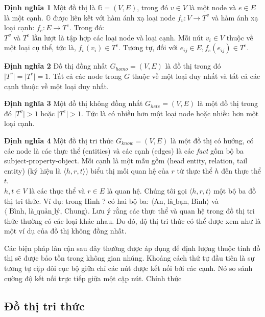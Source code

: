 \textbf{Định nghĩa 1} Một đồ thị là \(\mathbb{G} = (V, E)\), trong đó \(v \in V\) là một node và \(e \in E\) là một cạnh. \(\mathbb{G}\) được liên kết với hàm ánh xạ loại node \(f_v: V \to T^v\) và hàm ánh xạ loại cạnh: \(f_e: E \to T^e\). Trong đó: \\
\(T^v\) và \(T^e\) lần lượt là tập hợp các loại node và loại cạnh. Mỗi nút \(v_i \in V\) thuộc về một loại cụ thể, tức là, \(f_v(v_i) \in T^v\). Tương tự, đối với \(e_{ij} \in E, f_e (e_{ij}) \in T^e\).

\textbf{Định nghĩa 2} Đồ thị đồng nhất $G_{homo} = (V, E)$ là đồ thị trong đó $\mid T^v \mid = \mid T^e \mid = 1$. Tất cả các node trong $G$ thuộc về một loại duy nhất và tất cả các cạnh thuộc về một loại duy nhất.

\textbf{Định nghĩa 3} Một đồ thị không đồng nhất $G_{hete} = (V, E)$ là một đồ thị trong đó $\mid T^v \mid > 1$ hoặc $\mid T^e \mid > 1$. Tức là có nhiều hơn một loại node hoặc nhiều hơn một loại cạnh.

\textbf{Định nghĩa 4} Một đồ thị tri thức $G_{know} = (V, E)$ là một đồ thị có hướng, có các node là các thực thể (entities) và các cạnh (edges) là các \textit{fact} gồm bộ ba subject-property-object. Mỗi cạnh là một mẫu gồm (head entity, relation, tail entity) (ký hiệu là $\langle h, r, t \rangle$) biểu thị mối quan hệ của $r$ từ thực thể $h$ đến thực thể $t$.\\
$h, t \in V$ là các thực thể và $r \in E$ là quan hệ. Chúng tôi gọi $\langle h, r, t \rangle$ một bộ ba đồ thị tri thức. Ví dụ: trong Hình ? có hai bộ ba: $\langle \text{An, là_bạn, Bình} \rangle$ và $\langle \text{ Bình, là_quản_lý, Chung} \rangle$. Lưu ý rằng các thực thể và quan hệ trong đồ thị tri thức thường có các loại khác nhau. Do đó, độ thị tri thức có thể được xem như là một ví dụ của đồ thị không đồng nhất.

Các biện pháp lân cận sau đây thường được áp dụng để định lượng thuộc tính đồ thị sẽ được bảo tồn trong không gian nhúng. Khoảng cách thứ tự đầu tiên là sự tương tự cặp đôi cục bộ giữa chỉ các nút được kết nối bởi các cạnh. Nó so sánh cường độ kết nối trực tiếp giữa một cặp nút. Chính thức

\subsection{Đồ thị tri thức}

